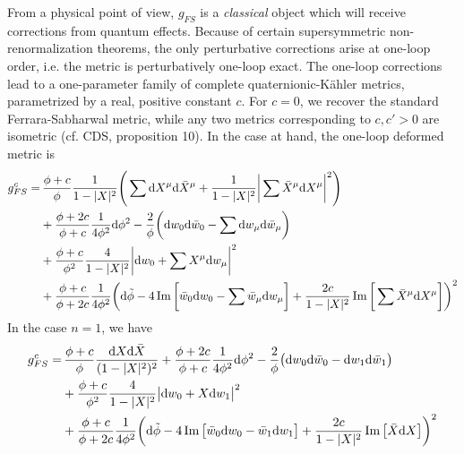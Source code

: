 \documentclass[parskip=half]{scrartcl}
\begin{document}
From a physical point of view, $g_{FS}$ is a \emph{classical} object which will receive corrections from quantum effects. Because of certain supersymmetric non-renormalization theorems, the only perturbative corrections arise at one-loop order, i.e. the metric is perturbatively one-loop exact. The one-loop corrections lead to a one-parameter family of complete quaternionic-K\"ahler metrics, parametrized by a real, positive constant $c$. For $c=0$, we recover the standard Ferrara-Sabharwal metric, while any two metrics corresponding to $c,c'>0$ are isometric (cf. CDS, proposition 10). In the case at hand, the one-loop deformed metric is
\begin{align*}
	g_{FS}^c=&\,\frac{\phi+c}{\phi}\frac{1}{1-\lvert X \rvert^2}\Bigg(\sum \mathrm{d} X^\mu \mathrm{d} \bar X^\mu 
	+ \frac{1}{1-\lvert X \rvert^2}\bigg|\sum \bar X^\mu \mathrm{d} X^\mu \bigg|^2\Bigg)\\
	&+\frac{\phi+2c}{\phi+c}\frac{1}{4\phi^2}\mathrm{d} \phi^2 
	-\frac{2}{\phi} \bigg( \mathrm{d} w_0 \mathrm{d} \bar w_0 - \sum \mathrm{d} w_\mu \mathrm{d} \bar w_\mu \bigg)\\
	&+\frac{\phi+c}{\phi^2}\frac{4}{1-\lvert X \rvert^2}\bigg|\mathrm{d} w_0 + \sum X^\mu \mathrm{d} w_\mu \bigg|^2\\
	&+\frac{\phi+c}{\phi+2c}\frac{1}{4\phi^2}\bigg(\mathrm{d}\tilde\phi
	-4\operatorname{Im}\bigg[\bar w_0\mathrm{d} w_0 - \sum \bar w_\mu \mathrm{d} w_\mu\bigg]
	+\frac{2c}{1-\lvert X \rvert^2}\operatorname{Im}\bigg[\sum \bar X^\mu \mathrm{d} X^\mu\bigg]\bigg)^2
\end{align*}
In the case $n=1$, we have
\begin{align*}
	g_{FS}^c=&\,\frac{\phi+c}{\phi}\frac{\mathrm{d} X \mathrm{d} \bar X}{(1-\lvert X \rvert^2)^2}
	+\frac{\phi+2c}{\phi+c}\frac{1}{4\phi^2}\mathrm{d} \phi^2 
	-\frac{2}{\phi} \big( \mathrm{d} w_0 \mathrm{d} \bar w_0 - \mathrm{d} w_1 \mathrm{d} \bar w_1 \big)\\
	&+\frac{\phi+c}{\phi^2}\frac{4}{1-\lvert X \rvert^2}\big|\mathrm{d} w_0 + X \mathrm{d} w_1 \big|^2\\
	&+\frac{\phi+c}{\phi+2c}\frac{1}{4\phi^2}\bigg(\mathrm{d}\tilde\phi
	-4\operatorname{Im}\big[\bar w_0\mathrm{d} w_0 - \bar w_1 \mathrm{d} w_1\big]
	+\frac{2c}{1-\lvert X \rvert^2}\operatorname{Im}\big[ \bar X \mathrm{d} X\big]\bigg)^2
\end{align*}
\end{document}
